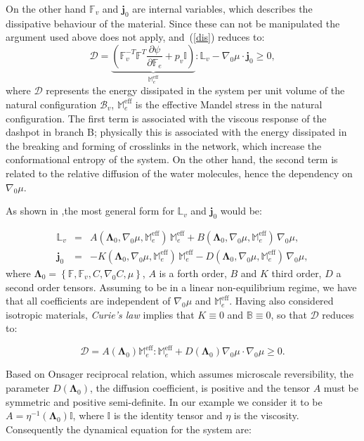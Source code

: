 \documentclass[12pt]{extarticle}
\newcommand{\F}{\ensuremath{\mathbb{F}}}
\newcommand{\B}{\ensuremath{\mathbb{B}}}
\newcommand{\LL}{\ensuremath{\mathbb{L}}}
\newcommand{\Me}{\ensuremath{\mathbb{M}_e^{\text{eff}}}}
\begin{document}
On the other hand $\F_v$ and $\mathbf{j}_0$ are internal variables, which describes the dissipative behaviour of the material. Since these can not be manipulated the argument used above does not apply, and~(\ref{dis}) reduces to:
\begin{equation}
\mathcal{D}=\underbrace{\left(\F_v^{-T}\F^{T} \frac{\partial \psi}{\partial \F_e}+p_v \mathbb{I}\right)}_{\Me}:\LL_v - \nabla_0 \mu \cdot \mathbf{j}_0 \geq 0,
\end{equation}
where $\mathcal{D}$ represents the energy dissipated in the system per unit volume of the natural configuration $\mathcal{B}_v$, $\Me$ is the effective Mandel stress in the natural configuration.
The first term is associated with the viscous response of the dashpot in branch B; physically this is associated with the energy dissipated in the breaking and forming of crosslinks in the network, which increase the conformational entropy of the system. On the other hand, the second term is related to the relative diffusion of the water molecules, hence the dependency on $\nabla_0 \mu$. 

As shown in \cite{Article2},the most general form for $\LL_v$ and $\mathbf{j}_0$ would be:

\begin{eqnarray}
\LL_v &=& A(\boldsymbol{\Lambda}_0, \nabla_0 \mu, \Me)\, \Me + B(\boldsymbol{\Lambda}_0,\nabla_0 \mu, \Me)\, \nabla_0 \mu,\\
\mathbf{j}_0 &=& -K(\boldsymbol{\Lambda}_0, \nabla_0 \mu, \Me) \, \Me - D(\boldsymbol{\Lambda}_0, \nabla_0 \mu, \Me) \, \nabla_0 \mu,
\end{eqnarray}
where $\boldsymbol{\Lambda}_0=\left\{\F,\F_v,C,\nabla_0 C, \mu\right\}$, $A$ is a forth order, $B$ and $K$ third order, $D$ a second order tensors. Assuming to be in a linear non-equilibrium regime, we have that all coefficients are independent of $\nabla_0 \mu$ and $\Me$. Having also considered isotropic materials, \textit{Curie's law} implies that $K\equiv0$ and $\B\equiv 0$, so that $\mathcal{D}$ reduces to:

\begin{equation*}
\mathcal{D}= A(\boldsymbol{\Lambda}_0) \Me : \Me  + D(\boldsymbol{\Lambda}_0)\nabla_0 \mu\cdot\nabla_0 \mu\geq 0 .
\end{equation*}

Based on Onsager reciprocal relation, which assumes microscale reversibility, the parameter $D(\boldsymbol{\Lambda}_0)$, the diffusion coefficient, is positive and the tensor $A$ must be symmetric and positive semi-definite. In our example we consider it to be $A=\eta^{-1}(\boldsymbol{\Lambda}_0) \mathbb{I}$, where $\mathbb{I}$ is the identity tensor and $\eta$ is the viscosity. Consequently the dynamical equation for the system are:
\end{document}
